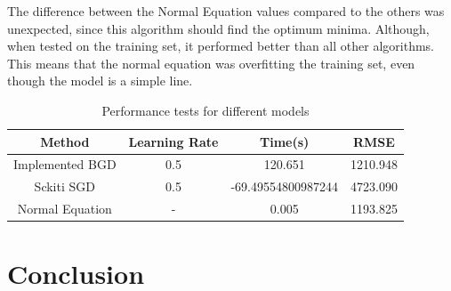 \documentclass[conference]{IEEEtran}
\begin{document}
	The difference between the Normal Equation values compared to the others was unexpected, since this algorithm should find the optimum minima. Although, when tested on the training set, it performed better than all other algorithms. This means that the normal equation was overfitting the training set, even though the model is a simple line.
	
  \begin{table}[h!]
    \begin{center}
      \caption{Performance tests for different models}
      \label{table:table2}
      \begin{tabular}[10pt]{c|c|c|c}
        Method & Learning Rate & Time(s) & RMSE\\
        \hline
        Implemented BGD & 0.5 & 120.651 & 1210.948 \\
        Sckiti SGD& 0.5 & -69.49554800987244 & 4723.090 \\
        Normal Equation & - & 0.005 & 1193.825 \\
    \end{tabular}
  \end{center}
\end{table}
	

\section{Conclusion}
\end{document}
